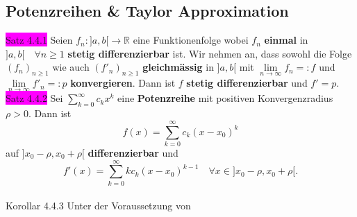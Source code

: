 \documentclass[landscape, 10pt]{article}
\newcommand{\R}{\mathbb{R}}
\begin{document}
\begin{multicols}{3}
       \subsection{Potenzreihen \& Taylor Approximation}
              \colorbox{magenta}{Satz 4.4.1} 
                     Seien \textcolor{NavyBlue}{
                     $f_n:]a,b[\longrightarrow\R$} 
                     eine Funktionenfolge wobei 
                     \textcolor{NavyBlue}{$f_n$} 
                     \textbf{einmal} in 
                     \textcolor{NavyBlue}{
                     $]a,b[\quad\forall n\geqslant1$} 
                     \textbf{stetig differenzierbar} ist.
                     Wir nehmen an, dass sowohl die Folge 
                     \textcolor{NavyBlue}{$(f_n)_{n\geqslant1}$} 
                     wie auch \textcolor{NavyBlue}{
                     $(f'_n)_{n\geqslant1}$} 
                     \textbf{gleichmässig} in 
                     \textcolor{NavyBlue}{$]a,b[$} mit 
                     \textcolor{NavyBlue}{
                     $\lim\limits_{n\to\infty}f_n=:f$} 
                     und \textcolor{NavyBlue}{
                     $\lim\limits_{n\to\infty}f'_n=:p$}
                     \textbf{konvergieren}. 
                     Dann ist \textcolor{NavyBlue}{$f$}
                     \textbf{stetig differenzierbar} 
                     und \textcolor{NavyBlue}{$f'=p$}. \\
              \colorbox{magenta}{Satz 4.4.2} 
                     Sei \textcolor{NavyBlue}{
                     $\sum_{k=0}^\infty c_kx^k$} 
                     eine \textbf{Potenzreihe} mit 
                     positiven Konvergenzradius 
                     \textcolor{NavyBlue}{$\rho>0$}. Dann ist
                     \begin{equation*}
                          f(x)=\sum_{k=0}^\infty c_k(x-x_0)^k  
                     \end{equation*}
                     auf 
                     \textcolor{NavyBlue}{$]x_0-\rho,x_0+\rho[$} 
                     \textbf{differenzierbar} und
                     \begin{equation*}
                            f'(x)
                            =\sum_{k=0}^\infty kc_k(x-x_0)^{k-1}
                            \quad
                            \forall x\in]x_0-\rho,x_0+\rho[.
                     \end{equation*}\\
              \colorbox{BurntOrange}{Korollar 4.4.3} 
                     Unter der Voraussetzung von 

\end{multicols}
\end{document}
